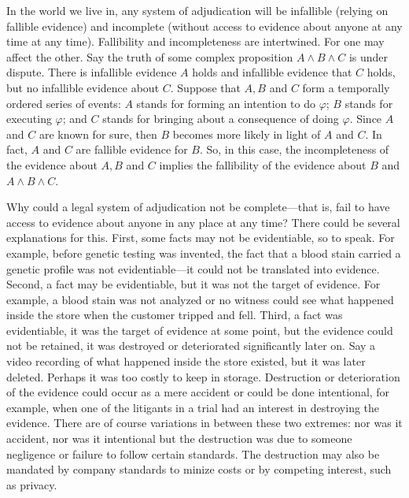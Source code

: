 \documentclass[
  10pt,
  dvipsnames,enabledeprecatedfontcommands]{scrartcl}
\begin{document}
In the world we live in, any system of adjudication will be infallible
(relying on fallible evidence) and incomplete (without access to
evidence about anyone at any time at any time). Fallibility and
incompleteness are intertwined. For one may affect the other. Say the
truth of some complex proposition \(A \wedge B \wedge C\) is under
dispute. There is infallible evidence \(A\) holds and infallible
evidence that \(C\) holds, but no infallible evidence about \(C\).
Suppose that \(A, B\) and \(C\) form a temporally ordered series of
events: \(A\) stands for forming an intention to do \(\varphi\); \(B\)
stands for executing \(\varphi\); and \(C\) stands for bringing about a
consequence of doing \(\varphi\). Since \(A\) and \(C\) are known for
sure, then \(B\) becomes more likely in light of \(A\) and \(C\). In
fact, \(A\) and \(C\) are fallible evidence for \(B\). So, in this case,
the incompleteness of the evidence about \(A, B\) and \(C\) implies the
fallibility of the evidence about \(B\) and \(A \wedge B \wedge C\).

Why could a legal system of adjudication not be complete---that is, fail
to have access to evidence about anyone in any place at any time? There
could be several explanations for this. First, some facts may not be
evidentiable, so to speak. For example, before genetic testing was
invented, the fact that a blood stain carried a genetic profile was not
evidentiable---it could not be translated into evidence. Second, a fact
may be evidentiable, but it was not the target of evidence. For example,
a blood stain was not analyzed or no witness could see what happened
inside the store when the customer tripped and fell. Third, a fact was
evidentiable, it was the target of evidence at some point, but the
evidence could not be retained, it was destroyed or deteriorated
significantly later on. Say a video recording of what happened inside
the store existed, but it was later deleted. Perhaps it was too costly
to keep in storage. Destruction or deterioration of the evidence could
occur as a mere accident or could be done intentional, for example, when
one of the litigants in a trial had an interest in destroying the
evidence. There are of course variations in between these two extremes:
nor was it accident, nor was it intentional but the destruction was due
to someone negligence or failure to follow certain standards. The
destruction may also be mandated by company standards to minize costs or
by competing interest, such as privacy.
\end{document}
